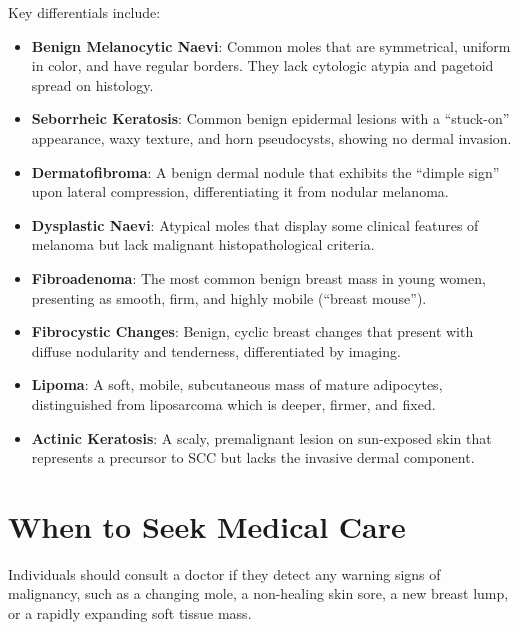 Key differentials include:
\begin{itemize}
    \item \textbf{Benign Melanocytic Naevi}: Common moles that are symmetrical, uniform in color, and have regular borders. They lack cytologic atypia and pagetoid spread on histology.
    \item \textbf{Seborrheic Keratosis}: Common benign epidermal lesions with a ``stuck-on'' appearance, waxy texture, and horn pseudocysts, showing no dermal invasion.
    \item \textbf{Dermatofibroma}: A benign dermal nodule that exhibits the ``dimple sign'' upon lateral compression, differentiating it from nodular melanoma.
    \item \textbf{Dysplastic Naevi}: Atypical moles that display some clinical features of melanoma but lack malignant histopathological criteria.
    \item \textbf{Fibroadenoma}: The most common benign breast mass in young women, presenting as smooth, firm, and highly mobile (``breast mouse'').
    \item \textbf{Fibrocystic Changes}: Benign, cyclic breast changes that present with diffuse nodularity and tenderness, differentiated by imaging.
    \item \textbf{Lipoma}: A soft, mobile, subcutaneous mass of mature adipocytes, distinguished from liposarcoma which is deeper, firmer, and fixed.
    \item \textbf{Actinic Keratosis}: A scaly, premalignant lesion on sun-exposed skin that represents a precursor to SCC but lacks the invasive dermal component.
\end{itemize}

\section*{When to Seek Medical Care}
Individuals should consult a doctor if they detect any warning signs of malignancy, such as a changing mole, a non-healing skin sore, a new breast lump, or a rapidly expanding soft tissue mass.

